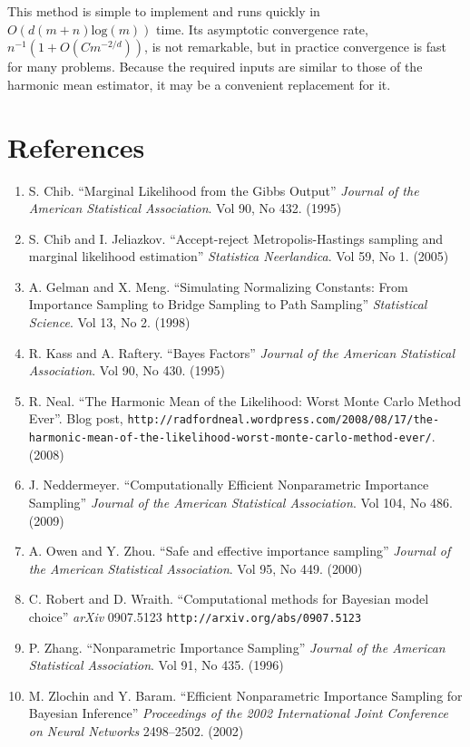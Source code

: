 \documentclass[letterpaper,12pt]{article}
\begin{document}
This method is simple to implement and runs quickly in
$O(d(m+n)\mbox{log}(m))$ time.  Its asymptotic convergence rate,
$n^{-1}(1+O(Cm^{-2/d}))$, is not remarkable, but in practice
convergence is fast for many problems.  Because the required inputs
are similar to those of the harmonic mean estimator, it may be a
convenient replacement for it.


\section{References}

\begin{enumerate}
  \item S. Chib.  ``Marginal Likelihood from the Gibbs Output''
    \emph{Journal of the American Statistical Association}.  Vol 90,
    No 432.  (1995)

  \item S. Chib and I. Jeliazkov.  ``Accept-reject Metropolis-Hastings
    sampling and marginal likelihood estimation'' \emph{Statistica
      Neerlandica}. Vol 59, No 1.  (2005)
  
  \item A. Gelman and X. Meng.  ``Simulating Normalizing Constants:
    From Importance Sampling to Bridge Sampling to Path Sampling''
    \emph{Statistical Science}. Vol 13, No 2. (1998)

  \item R. Kass and A. Raftery.  ``Bayes Factors'' \emph{Journal of the
  American Statistical Association}.  Vol 90, No 430.  (1995)

  \item R. Neal.  ``The Harmonic Mean of the Likelihood: Worst Monte
    Carlo Method Ever''.  Blog post,
    \texttt{http://radfordneal.wordpress.com/2008/08/17/the-harmonic-mean-of-the-likelihood-worst-monte-carlo-method-ever/}.  (2008)
    
  \item J. Neddermeyer.  ``Computationally Efficient Nonparametric
    Importance Sampling'' \emph{Journal of the American Statistical
      Association}.  Vol 104, No 486.  (2009)
  
  \item A. Owen and Y. Zhou. ``Safe and effective importance
    sampling'' \emph{Journal of the American Statistical
      Association}. Vol 95, No 449.  (2000)

  \item C. Robert and D. Wraith.  ``Computational methods for Bayesian
    model choice'' \emph{arXiv}  0907.5123
    \texttt{http://arxiv.org/abs/0907.5123}

  \item P. Zhang.  ``Nonparametric Importance Sampling'' \emph{Journal
    of the American Statistical Association}. Vol 91, No 435. (1996)

  \item M. Zlochin and Y. Baram.  ``Efficient Nonparametric
    Importance Sampling for Bayesian Inference'' \emph{Proceedings
      of the 2002 International Joint Conference on Neural Networks}
    2498--2502.  (2002)
    
    
    
\end{enumerate}
    
\end{document}
